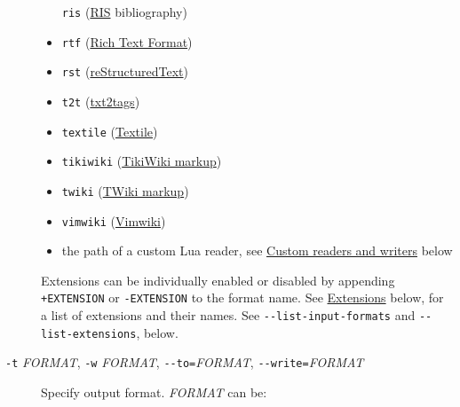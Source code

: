 \documentclass[
]{article}
\begin{document}
\begin{description}
\begin{itemize}
  \texttt{ris}
  (\href{https://en.wikipedia.org/wiki/RIS_(file_format)}{RIS}
  bibliography)
\item
  \texttt{rtf}
  (\href{https://en.wikipedia.org/wiki/Rich_Text_Format}{Rich Text
  Format})
\item
  \texttt{rst}
  (\href{https://docutils.sourceforge.io/docs/ref/rst/introduction.html}{reStructuredText})
\item
  \texttt{t2t} (\href{https://txt2tags.org}{txt2tags})
\item
  \texttt{textile} (\href{https://www.promptworks.com/textile}{Textile})
\item
  \texttt{tikiwiki}
  (\href{https://doc.tiki.org/Wiki-Syntax-Text\#The_Markup_Language_Wiki-Syntax}{TikiWiki
  markup})
\item
  \texttt{twiki}
  (\href{https://twiki.org/cgi-bin/view/TWiki/TextFormattingRules}{TWiki
  markup})
\item
  \texttt{vimwiki} (\href{https://vimwiki.github.io}{Vimwiki})
\item
  the path of a custom Lua reader, see
  \hyperref[custom-readers-and-writers]{Custom readers and writers}
  below
\end{itemize}

Extensions can be individually enabled or disabled by appending
\texttt{+EXTENSION} or \texttt{-EXTENSION} to the format name. See
\hyperref[extensions]{Extensions} below, for a list of extensions and
their names. See \texttt{-\/-list-input-formats} and
\texttt{-\/-list-extensions}, below.
\item[\texttt{-t} \emph{FORMAT}, \texttt{-w} \emph{FORMAT},
\texttt{-\/-to=}\emph{FORMAT}, \texttt{-\/-write=}\emph{FORMAT}]
Specify output format. \emph{FORMAT} can be:


\end{description}
\end{document}
